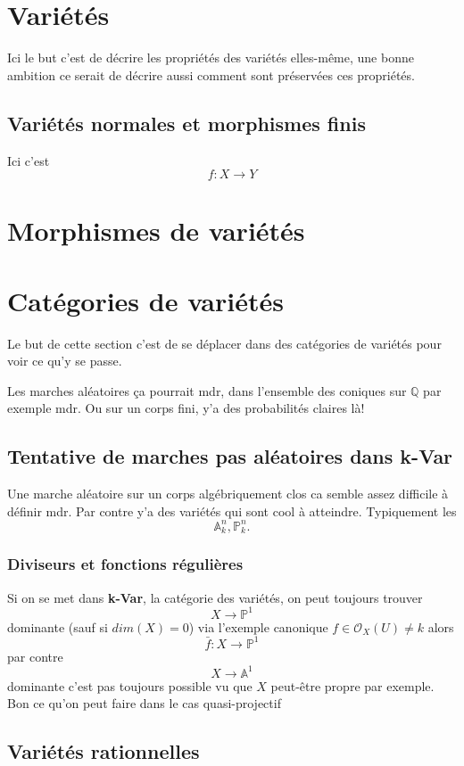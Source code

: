 \documentclass[a4paper,12pt]{book}
\newcommand{\Q}{\mathbb{Q}}
\newcommand{\A}{\mathbb{A}}
\newcommand{\Or}{\mathcal{O}}
\renewcommand{\P}{\mathbb{P}}
\theoremstyle{plain}
\theoremstyle{definition}
\theoremstyle{remark}
\begin{document}
\chapter{Variétés}
Ici le but c'est de décrire les propriétés des variétés elles-même,
une bonne ambition ce serait de décrire aussi comment sont préservées
ces propriétés.
\section{Variétés normales et morphismes finis}
Ici c'est 
\[f\colon X\to Y\]
\chapter{Morphismes de variétés}


\chapter{Catégories de variétés}
Le but de cette section c'est de se déplacer dans des catégories 
de variétés pour voir ce qu'y se passe. 

Les marches aléatoires ça pourrait mdr, dans l'ensemble des coniques
sur $\Q$ par exemple mdr. Ou sur un corps fini, y'a des probabilités
claires là!
\section{Tentative de marches pas aléatoires dans \textbf{k-Var}}
Une marche aléatoire sur un corps algébriquement clos ca semble assez
difficile à définir mdr. Par contre y'a des variétés qui sont cool
à atteindre. Typiquement les
\[\A^n_k,\P^n_k.\]
\subsection*{Diviseurs et fonctions régulières}
Si on se met dans \textbf{k-Var}, la catégorie des variétés,
on peut toujours trouver 
\[X\to \P^1\]
dominante (sauf si $dim(X)=0$) via l'exemple canonique 
$f\in \Or_X(U)\ne k$ alors 
\[\bar f\colon X\to \P^1\]
par contre 
\[X\to \A^1\]
dominante c'est pas toujours possible vu que $X$ peut-être propre par
exemple. 
Bon ce qu'on peut faire dans le cas quasi-projectif


\section{Variétés rationnelles}







\printbibliography
\end{document}
